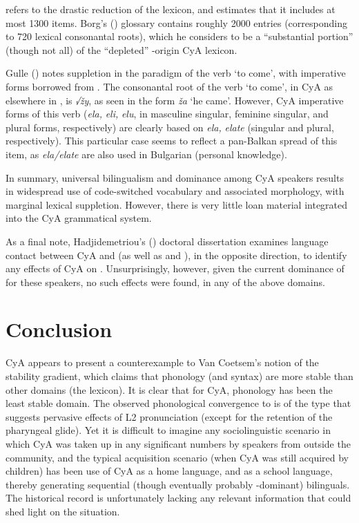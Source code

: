 \documentclass[output=paper]{langsci/langscibook}
\begin{document}
\citet{Roth2004} refers to the drastic reduction of the lexicon, and estimates that it includes at most 1300 items. Borg's (\citeyear{Borg2004}) glossary contains roughly 2000 entries (corresponding to 720 lexical consonantal {roots}), which he considers to be a “substantial portion” (though not all) of the “depleted” -origin CyA lexicon.

Gulle (\citeyear[45]{Gulle2016}) notes suppletion in the paradigm of the verb ‘to come’, with imperative forms borrowed from . The consonantal {root} of the verb ‘to come’, in CyA as elsewhere in , is \textit{√žy}, as seen in the form \textit{ža} ‘he came’. However, CyA imperative forms of this verb (\textit{ela,} \textit{eli,} \textit{elu}, in masculine singular, feminine singular, and plural forms, respectively) are clearly based on  \textit{ela,} \textit{elate} (singular and plural, respectively). This particular case seems to reflect a pan-Balkan spread of this item, as \textit{ela/elate} are also used in Bulgarian (personal knowledge).

In summary, universal {bilingualism} and  dominance among CyA speakers results in widespread use of code-switched  vocabulary and associated morphology, with marginal lexical suppletion. However, there is very little loan material integrated into the CyA grammatical system.

As a final note, Hadjidemetriou's (\citeyear{Hadjidemetriou2009}) doctoral dissertation examines language contact between CyA and  (as well as  and ), in the opposite direction, to identify any effects of CyA on . Unsurprisingly, however, given the current dominance of  for these speakers, no such effects were found, in any of the above domains.

\section{Conclusion}

CyA appears to present a counterexample to Van Coetsem’s notion of the {stability gradient}, which claims that phonology (and syntax) are more stable than other domains (the lexicon). It is clear that for CyA, phonology has been the least stable domain. The observed phonological {convergence} to  is of the type that suggests pervasive effects of L2 pronunciation (except for the retention of the {pharyngeal} glide). Yet it is difficult to imagine any sociolinguistic scenario in which CyA was taken up in any significant numbers by  speakers from outside the community, and the typical acquisition scenario (when CyA was still acquired by children) has been use of CyA as a home language, and  as a school language, thereby generating sequential (though eventually probably -dominant) bilinguals. The historical record is unfortunately lacking any relevant information that could shed light on the situation.
\end{document}
